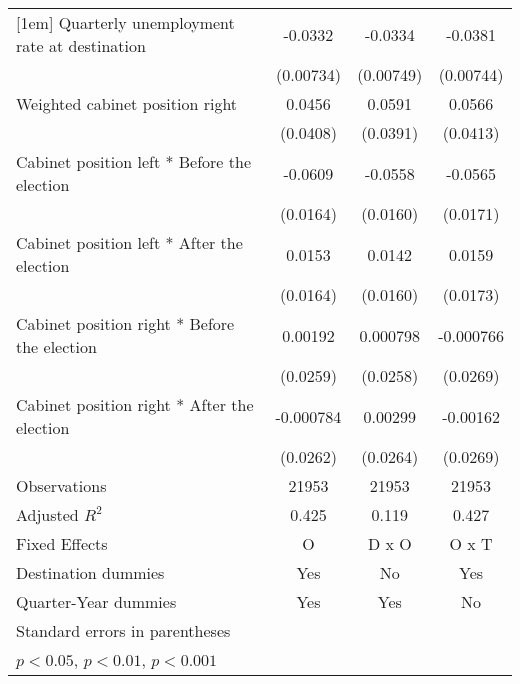 \begin{table}[htbp]
\begin{tabular}{l*{3}{c}}
[1em]
Quarterly unemployment rate at destination&     -0.0332\sym{***}&     -0.0334\sym{***}&     -0.0381\sym{***}\\
                    &   (0.00734)         &   (0.00749)         &   (0.00744)         \\
[1em]
Weighted cabinet position right&      0.0456         &      0.0591         &      0.0566         \\
                    &    (0.0408)         &    (0.0391)         &    (0.0413)         \\
[1em]
Cabinet position left * Before the election&     -0.0609\sym{***}&     -0.0558\sym{**} &     -0.0565\sym{**} \\
                    &    (0.0164)         &    (0.0160)         &    (0.0171)         \\
[1em]
Cabinet position left * After the election&      0.0153         &      0.0142         &      0.0159         \\
                    &    (0.0164)         &    (0.0160)         &    (0.0173)         \\
[1em]
Cabinet position right * Before the election&     0.00192         &    0.000798         &   -0.000766         \\
                    &    (0.0259)         &    (0.0258)         &    (0.0269)         \\
[1em]
Cabinet position right * After the election&   -0.000784         &     0.00299         &    -0.00162         \\
                    &    (0.0262)         &    (0.0264)         &    (0.0269)         \\
\hline
Observations        &       21953         &       21953         &       21953         \\
Adjusted \(R^{2}\)  &       0.425         &       0.119         &       0.427         \\
Fixed Effects       &           O         &       D x O         &       O x T         \\
Destination dummies &         Yes         &          No         &         Yes         \\
Quarter-Year dummies&         Yes         &         Yes         &          No         \\
\hline\hline
\multicolumn{4}{l}{\footnotesize Standard errors in parentheses}\\
\multicolumn{4}{l}{\footnotesize \sym{*} \(p<0.05\), \sym{**} \(p<0.01\), \sym{***} \(p<0.001\)}\\
\end{tabular}
\end{table}
